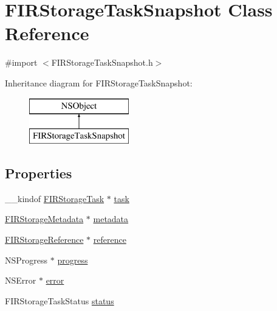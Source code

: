 \hypertarget{interface_f_i_r_storage_task_snapshot}{}\section{F\+I\+R\+Storage\+Task\+Snapshot Class Reference}
\label{interface_f_i_r_storage_task_snapshot}


{\ttfamily \#import $<$F\+I\+R\+Storage\+Task\+Snapshot.\+h$>$}

Inheritance diagram for F\+I\+R\+Storage\+Task\+Snapshot\+:\begin{figure}[H]
\begin{center}
\leavevmode
\includegraphics[height=2.000000cm]{interface_f_i_r_storage_task_snapshot}
\end{center}
\end{figure}
\subsection*{Properties}
\begin{DoxyCompactItemize}
\item 
\+\_\+\+\_\+kindof \hyperlink{interface_f_i_r_storage_task}{F\+I\+R\+Storage\+Task} $\ast$ \hyperlink{interface_f_i_r_storage_task_snapshot_a77fe9c6a0a95cbcc38b8efa358d0b4f6}{task}
\item 
\hyperlink{interface_f_i_r_storage_metadata}{F\+I\+R\+Storage\+Metadata} $\ast$ \hyperlink{interface_f_i_r_storage_task_snapshot_ae7f7f0af71f1e41b90ddfa95d739ed80}{metadata}
\item 
\hyperlink{interface_f_i_r_storage_reference}{F\+I\+R\+Storage\+Reference} $\ast$ \hyperlink{interface_f_i_r_storage_task_snapshot_a475feffa15b89b28043356a36efeefa6}{reference}
\item 
N\+S\+Progress $\ast$ \hyperlink{interface_f_i_r_storage_task_snapshot_a3028516bd16e51c07dbc3c09873b66d5}{progress}
\item 
N\+S\+Error $\ast$ \hyperlink{interface_f_i_r_storage_task_snapshot_a7eb79419e14f2ded56d38ae8713e9299}{error}
\item 
F\+I\+R\+Storage\+Task\+Status \hyperlink{interface_f_i_r_storage_task_snapshot_a9c558313c12d53012cc7a31bbd927262}{status}
\end{DoxyCompactItemize}


